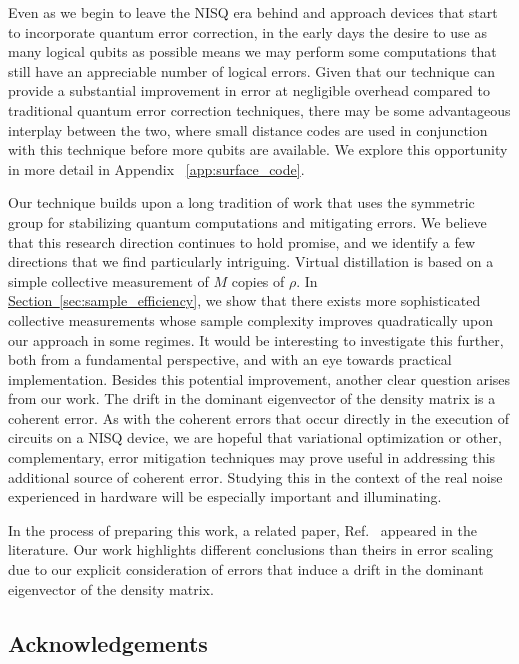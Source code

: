 \documentclass[
amsmath,
amssymb,
aps,
pra,
reprint,
twocolumn,
superscriptaddress,
longbibliography,
showkeys,
floatfix
]{revtex4-1}
\renewcommand{\sec}[1]{\hyperref[sec:#1]{Section~\ref*{sec:#1}}}
\begin{document}
Even as we begin to leave the NISQ era behind and approach devices that start to incorporate quantum error correction,
in the early days the desire to use as many logical qubits as possible means we
may perform some computations that still have an appreciable number of logical
errors. 
Given that our technique can provide a substantial improvement in error at
negligible overhead compared to traditional quantum error correction techniques,
there may be some advantageous interplay between the two, where small distance
codes are used in conjunction with this technique before more qubits are
available. 
We explore this opportunity in more detail in Appendix ~\ref{app:surface_code}.

Our technique builds upon a long tradition of work that uses the symmetric group
for stabilizing quantum computations and mitigating errors. 
We believe that this research direction continues to hold promise, and we
identify a few directions that we find particularly intriguing. 
Virtual distillation is based on a simple collective measurement of \(M\) copies
of \(\rho\). 
In \sec{sample_efficiency}, we show that there exists more sophisticated
collective measurements whose sample complexity improves quadratically upon our
approach in some regimes. 
It would be interesting to investigate this further, both from a fundamental
perspective, and with an eye towards practical implementation. 
Besides this potential improvement, another clear question arises from our work. 
The drift in the dominant eigenvector of the density matrix is a coherent error.
As with the coherent errors that occur directly in the execution of circuits on
a NISQ device, we are hopeful that variational optimization or other,
complementary, error mitigation techniques may prove useful in addressing this
additional source of coherent error.
Studying this in the context of the real noise experienced in hardware will be
especially important and illuminating.

In the process of preparing this work, a related paper,
Ref.~ appeared in the literature. 
Our work highlights different conclusions than theirs in error scaling due to
our explicit consideration of errors that induce a drift in the dominant
eigenvector of the density matrix.


\subsection*{Acknowledgements}
\end{document}
